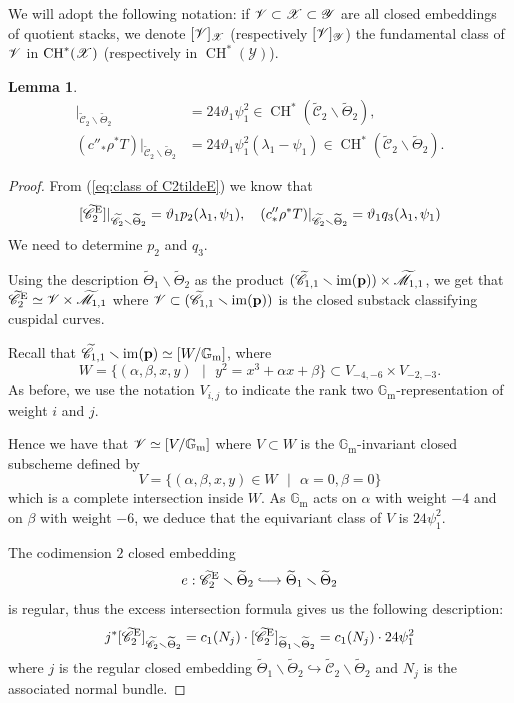 \documentclass[a4paper, 10pt]{amsart}
\numberwithin{equation}{section}
\numberwithin{subsection}{section}
\newtheorem{lemma}[theorem]{Lemma}
\theoremstyle{definition}
\theoremstyle{remark}
\renewcommand{\mathcal}{\mathscr}
\newcommand\cY{\mathcal{Y}} \newcommand\cZ{\mathcal{Z}}
\newcommand\GG{\mathbb{G}} \newcommand\HH{\mathbb{H}}
\newcommand\rmm{\mathrm{m}} \newcommand\rmn{\mathrm{n}}
\newcommand{\hooklongrightarrow}{\lhook\joinrel\longrightarrow}
\newcommand\im[1]{\operatorname{im}(#1)}
\renewcommand{\setminus}{\smallsetminus}
\newcommand{\gm}{\GG_{\rmm}}
\newcommand{\Mtilde}{\widetilde{\mathcal M}}
\newcommand{\Ctilde}{\widetilde{\mathcal C}}
\newcommand{\ThTilde}{\widetilde{\Theta}}
\newcommand{\ch}[1][*]{\operatorname{CH}^{#1}}
\begin{document}
	We will adopt the following notation: if $\cV\subset \cX \subset \cY$ are all closed embeddings of quotient stacks, we denote $[\cV]_{\cX}$ (respectively $[\cV]_{\cY}$) the fundamental class of $\cV$ in $\ch(\cX)$ (respectively in $\ch(\cY)$).
	\begin{lemma}\label{lm:C2tildeE in the open}
		\begin{align*}
		[\Ctilde_2^{\rm E}]|_{\Ctilde_2\smallsetminus\ThTilde_2} &=24\vartheta_1\psi_1^2 \in \ch(\Ctilde_2 \setminus \ThTilde_2), \\
		(c''_*\rho^*T)|_{\Ctilde_2\smallsetminus\ThTilde_2} &= 24\vartheta_1\psi_1^2(\lambda_1-\psi_1) \in \ch(\Ctilde_2 \setminus \ThTilde_2).
		\end{align*} 
	\end{lemma}
	
	\begin{proof}
		From (\ref{eq:class of C2tildeE}) we know that
		\[[\Ctilde_2^{\rm E}]|_{\Ctilde_2\smallsetminus\ThTilde_2}=\vartheta_1p_2(\lambda_1,\psi_1), \quad (c''_*\rho^*T)|_{\Ctilde_2\smallsetminus\ThTilde_2} = \vartheta_1q_3(\lambda_1,\psi_1)\]
		We need to determine $p_2$ and $q_3$.
		
		Using the description $\ThTilde_1 \setminus \ThTilde_2$ as the product $(\Ctilde_{1,1}\setminus \im{\bfp}) \times \Mtilde_{1,1}$, we get that $\Ctilde_2^{\rm E} \simeq \cV \times \Mtilde_{1,1}$ where $\cV \subset (\Ctilde_{1,1}\setminus \im{\bfp})$ is the closed substack classifying cuspidal curves. 
		
		Recall that $\Ctilde_{1,1}\setminus \im{\bfp}\simeq [W/\gm]$, where
		\[ W=\{(\alpha,\beta,x,y)\text{ }|\text{ }y^2=x^3+\alpha x + \beta \} \subset V_{-4,-6}\times V_{-2,-3}. \]
		As before, we use the notation $V_{i,j}$ to indicate the rank two $\gm$-representation of weight $i$ and $j$.
		
		Hence we have that $\cV\simeq [V/\gm]$ where $V\subset W$ is the $\gm$-invariant closed subscheme defined by 
		$$V=\{ (\alpha,\beta,x,y) \in W\text{ }\vert\text{ }\alpha=0,\beta=0\}$$
		which is a complete intersection inside $W$. As $\gm$ acts on $\alpha$ with weight $-4$ and on $\beta$ with weight $-6$, we deduce that the equivariant class of $V$ is $24\psi_1^2$.
		
		The codimension $2$ closed embedding 
		\[ e:\Ctilde_2^{\rm E} \setminus \ThTilde_2 \hooklongrightarrow \ThTilde_1 \setminus \ThTilde_2\]
		is regular, thus the excess intersection formula gives us the following description:
		$$j^*[\Ctilde_2^{\rm E}]_{\Ctilde_2 \setminus \ThTilde_2} = c_1(N_j) \cdot [\Ctilde_2^{\rm E}]_{\ThTilde_1 \setminus \ThTilde_2}= c_1(N_j)\cdot 24\psi_1^2$$
		where $j$ is the regular closed embedding $\ThTilde_1 \setminus \ThTilde_2 \hookrightarrow \Ctilde_2 \setminus \ThTilde_2$ and $N_j$ is the associated normal bundle.
		

\end{proof}
\end{document}
